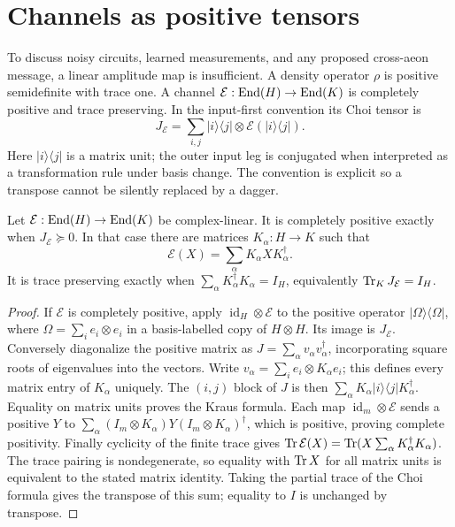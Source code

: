\section{Channels as positive tensors}

To discuss noisy circuits, learned measurements, and any proposed cross-aeon message, a linear amplitude map is insufficient. A density operator $\rho$ is positive semidefinite with trace one. A channel $\mathcal E:\operatorname{End}(H)\to\operatorname{End}(K)$ is completely positive and trace preserving. In the input-first convention its Choi tensor is
\[
 J_{\mathcal E}=\sum_{i,j}|i\rangle\langle j|\otimes
          \mathcal E(|i\rangle\langle j|).
\]
Here $|i\rangle\langle j|$ is a matrix unit; the outer input leg is conjugated when interpreted as a transformation rule under basis change. The convention is explicit so a transpose cannot be silently replaced by a dagger.

\begin{theorem}
\label{thm:choi-criterion}
Let $\mathcal E:\operatorname{End}(H)\to\operatorname{End}(K)$ be complex-linear. It is completely positive exactly when $J_{\mathcal E}\succeq0$. In that case there are matrices $K_\alpha:H\to K$ such that
\[
 \mathcal E(X)=\sum_\alpha K_\alpha X K_\alpha^\dagger.
\]
It is trace preserving exactly when
$\sum_\alpha K_\alpha^\dagger K_\alpha=I_H$, equivalently
$\operatorname{Tr}_KJ_{\mathcal E}=I_H$.
\end{theorem}
\begin{proof}
If $\mathcal E$ is completely positive, apply $\operatorname{id}_H\otimes\mathcal E$ to the positive operator $|\Omega\rangle\langle\Omega|$, where $\Omega=\sum_ie_i\otimes e_i$ in a basis-labelled copy of $H\otimes H$. Its image is $J_{\mathcal E}$.
Conversely diagonalize the positive matrix as $J=\sum_\alpha v_\alpha v_\alpha^\dagger$, incorporating square roots of eigenvalues into the vectors. Write
$v_\alpha=\sum_i e_i\otimes K_\alpha e_i$; this defines every matrix entry of $K_\alpha$ uniquely. The $(i,j)$ block of $J$ is then
$\sum_\alpha K_\alpha|i\rangle\langle j|K_\alpha^\dagger$.
Equality on matrix units proves the Kraus formula. Each map
$\operatorname{id}_m\otimes\mathcal E$ sends a positive $Y$ to
$\sum_\alpha(I_m\otimes K_\alpha)Y(I_m\otimes K_\alpha)^\dagger$, which is positive, proving complete positivity.
Finally cyclicity of the finite trace gives
$\operatorname{Tr}\mathcal E(X)=\operatorname{Tr}(X\sum_\alpha K_\alpha^\dagger K_\alpha)$.
The trace pairing is nondegenerate, so equality with $\operatorname{Tr} X$ for all matrix units is equivalent to the stated matrix identity. Taking the partial trace of the Choi formula gives the transpose of this sum; equality to $I$ is unchanged by transpose.
\end{proof}

